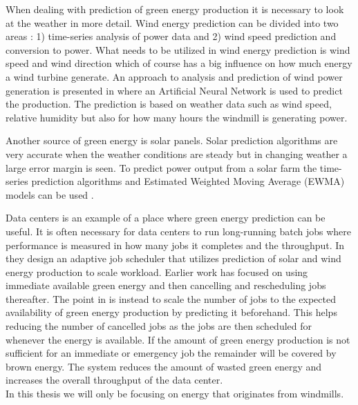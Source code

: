 When dealing with prediction of green energy production it is necessary to look at the weather in more detail. Wind energy prediction can be divided into two areas \cite{5}: 1) time-series analysis of power data and 2) wind speed prediction and conversion to power. What needs to be utilized in wind energy prediction is wind speed and wind direction which of course has a big influence on how much energy a wind turbine generate. An approach to analysis and prediction of wind power generation is presented in \cite{WindPowerGenerationUsingANN} where an Artificial Neural Network is used to predict the production. The prediction is based on weather data such as wind speed, relative humidity but also for how many hours the windmill is generating power.

Another source of green energy is solar panels. Solar
prediction algorithms are very accurate when the weather conditions are steady but in changing weather a large error margin is seen. To predict power output from a solar farm the time-series prediction algorithms and Estimated Weighted Moving Average (EWMA) models can be used \cite{5}.

Data centers is an example of a place where green energy prediction can be useful. It is often necessary for data centers to run long-running batch jobs where performance is measured in how many jobs it completes and the throughput. In \cite{5} they design an adaptive job scheduler that utilizes prediction of solar and wind energy production to scale workload. Earlier work has focused on using immediate available green energy and then cancelling and rescheduling jobs thereafter. The point in \cite{5} is instead to scale the number of jobs to the expected availability of green energy production by predicting it beforehand. This helps reducing the number of cancelled jobs as the jobs are then scheduled for whenever the energy is available. If the amount of green energy production is not sufficient for an immediate or emergency job the remainder will be covered by brown energy. The system reduces the amount of wasted green energy and increases the overall throughput of the data center.
\\[0.5cm]
In this thesis we will only be focusing on energy that originates from windmills.